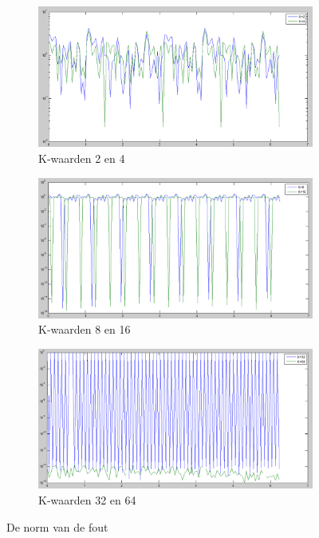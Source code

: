 \documentclass[a4paper, 12pt, titlepage]{report}
\begin{document}
\begin{figure}
\centering
\begin{subfigure}{.5\textwidth}
  \centering
  \includegraphics[width=\linewidth]{errorK2K4.png}
  \caption{K-waarden 2 en 4}
  \label{fig:normsub1}
\end{subfigure}%
\begin{subfigure}{.5\textwidth}
  \centering
  \includegraphics[width=\linewidth]{errorK8K16.png}
  \caption{K-waarden 8 en 16}
  \label{fig:normsub2}
\end{subfigure}
\begin{subfigure}{.5\textwidth}
  \centering
  \includegraphics[width=\linewidth]{errorK32K64.png}
  \caption{K-waarden 32 en 64}
  \label{fig:normsub3}
\end{subfigure}
\caption{De norm van de fout}
\label{fig:norm}
\end{figure}
\end{document}

